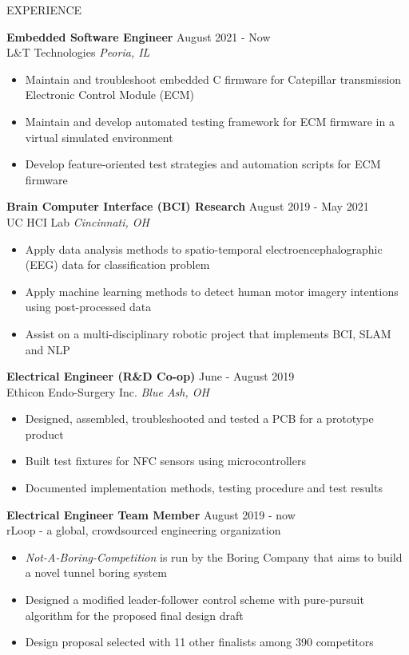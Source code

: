 \documentclass{../lib/resume} %
\begin{document}
\begin{rSection}{EXPERIENCE}

    \textbf{Embedded Software Engineer} \hfill August 2021 - Now \\
    L\&T Technologies \hfill \textit{Peoria, IL}
    \begin{itemize}
        \itemsep -4pt {}
        \item Maintain and troubleshoot embedded C firmware for Catepillar transmission Electronic Control Module (ECM)
        \item Maintain and develop automated testing framework for ECM firmware in a virtual simulated environment
        \item Develop feature-oriented test strategies and automation scripts for ECM firmware
    \end{itemize}

    \textbf{Brain Computer Interface (BCI) Research} \hfill August 2019 - May 2021 \\
    UC HCI Lab \hfill \textit{Cincinnati, OH}
    \begin{itemize}
        \itemsep -4pt {}
        \item Apply data analysis methods to spatio-temporal electroencephalographic (EEG) data for classification problem
        \item Apply machine learning methods to detect human motor imagery intentions using post-processed data
        \item Assist on a multi-disciplinary robotic project that implements BCI, SLAM and NLP
    \end{itemize}


    \textbf{Electrical Engineer (R\&D Co-op)} \hfill June - August 2019\\
    Ethicon Endo-Surgery Inc. \hfill \textit{Blue Ash, OH}
    \begin{itemize}
        \itemsep -4pt {}
        \item Designed, assembled, troubleshooted and tested a PCB for a prototype product
        \item Built test fixtures for NFC sensors using microcontrollers
        \item Documented implementation methods, testing procedure and test results
    \end{itemize}

    \textbf{Electrical Engineer Team Member} \hfill August 2019 - now
    \\	rLoop - a global, crowdsourced engineering organization \hfill \textit{}
    \begin{itemize}
        \itemsep -4pt {}
        \item \textit{Not-A-Boring-Competition} is run by the Boring Company that aims to build a novel tunnel boring system
        \item Designed a modified leader-follower control scheme with pure-pursuit algorithm for the proposed final design draft
        \item Design proposal selected with 11 other finalists among 390 competitors
    \end{itemize}




\end{rSection}
\end{document}
